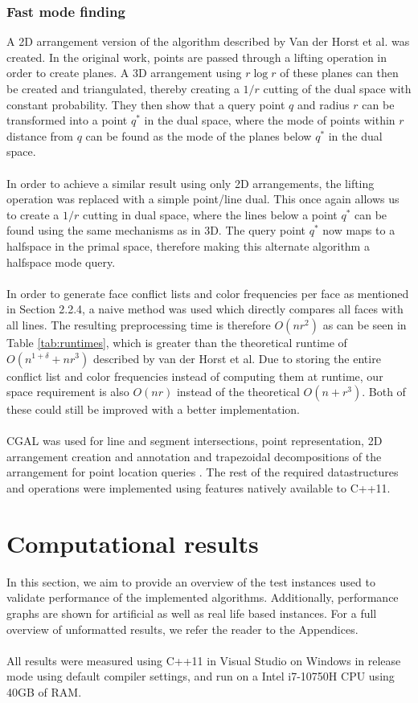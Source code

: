 \documentclass{article}
\newcommand{\fb}[1]{{\color{blue}#1}}
\begin{document}
\subsubsection{Fast mode finding}
A 2D arrangement version of the algorithm described by Van der Horst et al. was
created. In the original work, points are passed through a lifting operation in
order to create planes. A 3D arrangement using $r \log r$ of these planes can
then be created and triangulated, thereby creating a $1/r$ cutting of the dual
space with constant probability. They then show that a query point $q$ and
radius $r$ can be transformed into a point $q^*$ in the dual space, where the
mode of points within $r$ distance from $q$ can be found as the mode of the
planes below $q^*$ in the dual space. \\\\ In order to achieve a similar result
using only 2D arrangements, the lifting operation was replaced with a simple
point/line dual. This once again allows us to create a $1/r$ cutting in dual
space, where the lines below a point $q^*$ can be found using the same
mechanisms as in 3D. The query point $q^*$ now maps to a halfspace in the
primal space, therefore making this alternate algorithm a halfspace mode query.
\\\\ In order to generate face conflict lists and color frequencies per face as
mentioned in Section 2.2.4, a naive method was used which directly compares all
faces with all lines. The resulting preprocessing time is therefore $O(nr^2)$ as can be seen in Table \ref{tab:runtimes}, which is
greater than the theoretical runtime of \fb{$O(n^{1+\delta}+nr^3)$ described by van der Horst et al.} Due to storing
the entire conflict list and color frequencies instead of computing them at
runtime, our space requirement is also $O(nr)$ instead of the theoretical $O(n
    + r^3)$. Both of these could still be improved with a better implementation.
\\\\ CGAL was used for line and segment intersections, point representation, 2D
arrangement creation and annotation and trapezoidal decompositions of the
arrangement for point location queries \cite{cgal:foundations}
\cite{cgal:numbertypes} \cite{cgal:arrangement}. The rest of the required
datastructures and operations were implemented using features natively
available to C++11.
\section{Computational results}
In this section, we aim to provide an overview of the test instances used to
validate performance of the implemented algorithms. Additionally, performance
graphs are shown for artificial as well as real life based instances. For a
full overview of unformatted results, we refer the reader to the Appendices.
\\\\ All results were measured using C++11 in Visual Studio on Windows in
release mode using default compiler settings, and run on a Intel i7-10750H CPU
using 40GB of RAM.
\end{document}
